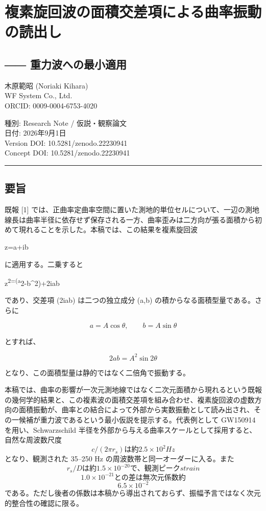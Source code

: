 \documentclass[
  a4paper,
]{ltjsarticle}
\author{}
\date{}
\begin{document}
\section{複素旋回波の面積交差項による曲率振動の読出し}\label{ux8907ux7d20ux65cbux56deux6ce2ux306eux9762ux7a4dux4ea4ux5deeux9805ux306bux3088ux308bux66f2ux7387ux632fux52d5ux306eux8aadux51faux3057}

\subsection{――
重力波への最小適用}\label{ux91cdux529bux6ce2ux3078ux306eux6700ux5c0fux9069ux7528}

木原範昭 (Noriaki Kihara)\\
WF System Co., Ltd.\\
ORCID: 0009-0004-6753-4020

種別: Research Note / 仮説・観察論文\\
日付: 2026年9月1日\\
Version DOI: 10.5281/zenodo.22230941\\
Concept DOI: 10.5281/zenodo.22230941

\begin{center}\rule{0.5\linewidth}{0.5pt}\end{center}

\subsection{要旨}\label{ux8981ux65e8}

既報 {[}1{]}
では、正曲率定曲率空間に置いた測地的単位セルについて、一辺の測地線長は曲率半径に依存せず保存される一方、曲率歪みは二方向が張る面積から初めて現れることを示した。本稿では、この結果を複素旋回波

z=a+ib

に適用する。二乗すると

z\textsuperscript{2=(a}2-b\^{}2)+2iab

であり、交差項 (2iab) は二つの独立成分 (a,b)
の積からなる面積型量である。さらに

\[a=A\cos\theta,\qquad b=A\sin\theta\]

とすれば、

\[2ab=A^2\sin 2\theta\]

となり、この面積型量は静的ではなく二倍角で振動する。

本稿では、曲率の影響が一次元測地線ではなく二次元面積から現れるという既報の幾何学的結果と、この複素波の面積交差項を組み合わせ、複素旋回波の虚数方向の面積振動が、曲率との結合によって外部から実数振動として読み出され、その一候補が重力波であるという最小仮説を提示する。代表例として
GW150914 を用い、Schwarzschild
半径を外部から与える曲率スケールとして採用すると、自然な周波数尺度
\[c/(2\pi r_s) は約 2.5 \times 10^2 Hz\] となり、観測された 35--250 Hz
の周波数帯と同一オーダーに入る。また
\[r_s/D は約 1.5 \times 10^{-20} で、観測ピーク strain\]
\[1.0 \times 10^{-21} との差は無次元係数約\] \[6.5 \times 10^{-2}\]
である。ただし後者の係数は本稿から導出されておらず、振幅予言ではなく次元的整合性の確認に限る。
\end{document}
